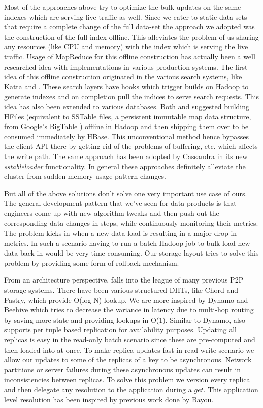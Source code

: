 \documentclass[10pt,twocolumn,preprint,nonatbib,numbers]{sigplanconf}
\begin{document}
Most of the approaches above try to optimize the bulk updates on the same indexes which are serving live traffic as well. Since we cater to static data-sets that require a complete change of the full data-set the approach we adopted was the construction of the full index offline. This alleviates the problem of us sharing any resources (like CPU and memory) with the index which is serving the live traffic. Usage of MapReduce for this offline construction has actually been a well researched idea with implementations in various production systems. The first idea of this offline construction originated in the various search systems, like Katta\cite{katta} and \cite{mika}. These search layers have hooks which trigger builds on Hadoop to generate indexes and on completion pull the indices to serve search requests. This idea has also been extended to various databases. Both \cite{konstantinou} and \cite{barbuzzi} suggested building HFiles (equivalent to SSTable files, a persistent immutable map data structure, from Google's BigTable \cite{bigtable}) offline in Hadoop and then shipping them over to be consumed immediately by HBase\cite{hbase}. This unconventional method hence bypasses the client API there-by getting rid of the problems of buffering, etc. which affects the write path. The same approach has been adopted by Cassandra\cite{cassandra} in its new \emph{sstableloader}\cite{cassandra_bulk} functionality. In general these approaches definitely alleviate the cluster from sudden memory usage pattern changes. 

But all of the above solutions don't solve one very important use case of ours. The general development pattern that we've seen for data products is that engineers come up with new algorithm tweaks and then push out the corresponding data changes in steps, while continuously monitoring their metrics. The problem kicks in when a new data load is resulting in a major drop in metrics. In such a scenario having to run a batch Hadoop job to bulk load new data back in would be very time-consuming. Our storage layout tries to solve this problem by providing some form of rollback mechanism. 
 
From an architecture perspective, \projectname{} falls into the league of many previous P2P storage systems. There have been various structured DHTs, like Chord\cite{chord} and Pastry\cite{pastry}, which provide O(log N) lookup. We are more inspired by Dynamo and Beehive\cite{beehive} which tries to decrease the variance in latency due to multi-hop routing by saving more state and providing lookups in O(1). Similar to Dynamo, \projectname{} also supports per tuple based replication for availability purposes. Updating all replicas is easy in the read-only batch scenario since these are pre-computed and then loaded into \projectname{} at once. To make replica updates fast in read-write scenario we allow our updates to some of the replicas of a key to be asynchronous. Network partitions or server failures during these asynchronous updates can result in inconsistencies between replicas. To solve this problem we version every replica and then delegate any resolution to the application during a $get$. This application level resolution has been inspired by previous work done by Bayou\cite{bayou}. 
\end{document}
